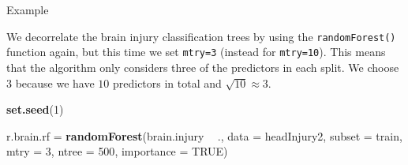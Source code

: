 \documentclass[10pt,ignorenonframetext,]{beamer}
\newenvironment{Shaded}{\begin{snugshade}}{\end{snugshade}}
\newcommand{\DataTypeTok}[1]{\textcolor[rgb]{0.13,0.29,0.53}{#1}}
\newcommand{\DecValTok}[1]{\textcolor[rgb]{0.00,0.00,0.81}{#1}}
\newcommand{\KeywordTok}[1]{\textcolor[rgb]{0.13,0.29,0.53}{\textbf{#1}}}
\newcommand{\NormalTok}[1]{#1}
\newcommand{\OperatorTok}[1]{\textcolor[rgb]{0.81,0.36,0.00}{\textbf{#1}}}
\newcommand{\OtherTok}[1]{\textcolor[rgb]{0.56,0.35,0.01}{#1}}
\newcommand{\StringTok}[1]{\textcolor[rgb]{0.31,0.60,0.02}{#1}}
\begin{document}
\begin{frame}[fragile]

\begin{block}{Example}

\vspace{2mm}

We decorrelate the brain injury classification trees by using the
\texttt{randomForest()} function again, but this time we set
\texttt{mtry=3} (instead for \texttt{mtry=10}). This means that the
algorithm only considers three of the predictors in each split. We
choose \(3\) because we have \(10\) predictors in total and
\(\sqrt{10}\approx 3\).

\vspace{2mm}

\scriptsize

\begin{Shaded}
\begin{Highlighting}[]
\KeywordTok{set.seed}\NormalTok{(}\DecValTok{1}\NormalTok{)}

\NormalTok{r.brain.rf =}\StringTok{ }\KeywordTok{randomForest}\NormalTok{(brain.injury }\OperatorTok{~}\StringTok{ }\NormalTok{., }\DataTypeTok{data =}\NormalTok{ headInjury2, }\DataTypeTok{subset =}\NormalTok{ train, }
    \DataTypeTok{mtry =} \DecValTok{3}\NormalTok{, }\DataTypeTok{ntree =} \DecValTok{500}\NormalTok{, }\DataTypeTok{importance =} \OtherTok{TRUE}\NormalTok{)}
\end{Highlighting}
\end{Shaded}

\end{block}

\end{frame}
\end{document}
